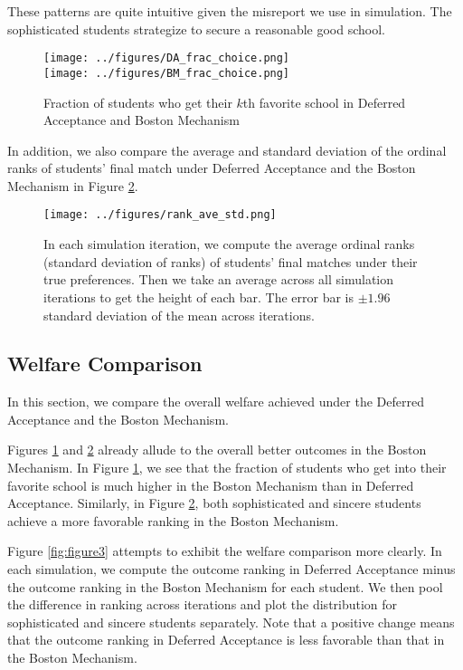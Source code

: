 \documentclass{article}
\begin{document}
These patterns are quite intuitive given the misreport we use in simulation. The sophisticated students strategize to secure a reasonable good school. 

\begin{figure}[h]
  \centering
  \texttt{[image: ../figures/DA\_frac\_choice.png]}\\
  \texttt{[image: ../figures/BM\_frac\_choice.png]}
  \caption{Fraction of students who get their $k$th favorite school in Deferred Acceptance and Boston Mechanism}
  \label{fig:figure1}
\end{figure}

In addition, we also compare the average and standard deviation of the ordinal ranks of students' final match under Deferred Acceptance and the Boston Mechanism in Figure \ref{fig:figure2}. 
\begin{figure}[h]
  \centering
  \texttt{[image: ../figures/rank\_ave\_std.png]}
  \caption{In each simulation iteration, we compute the average ordinal ranks (standard deviation of ranks) of students' final matches under their true preferences. Then we take an average across all simulation iterations to get the height of each bar. The error bar is $\pm 1.96$ standard deviation of the mean across iterations. 
  }
  \label{fig:figure2}
\end{figure}

\subsection{Welfare Comparison}
In this section, we compare the overall welfare achieved under the Deferred Acceptance and the Boston Mechanism. 

Figures \ref{fig:figure1} and \ref{fig:figure2} already allude to the overall better outcomes in the Boston Mechanism. In Figure \ref{fig:figure1}, we see that the fraction of students who get into their favorite school is much higher in the Boston Mechanism than in Deferred Acceptance. Similarly, in Figure \ref{fig:figure2}, both sophisticated and sincere students achieve a more favorable ranking in the Boston Mechanism. 

Figure \ref{fig:figure3} attempts to exhibit the welfare comparison more clearly. In each simulation, we compute the outcome ranking in Deferred Acceptance minus the outcome ranking in the Boston Mechanism for each student. %
We then pool the difference in ranking across iterations and plot the distribution for sophisticated and sincere students separately. Note that a positive change means that the outcome ranking in Deferred Acceptance is less favorable than that in the Boston Mechanism. 
\end{document}
